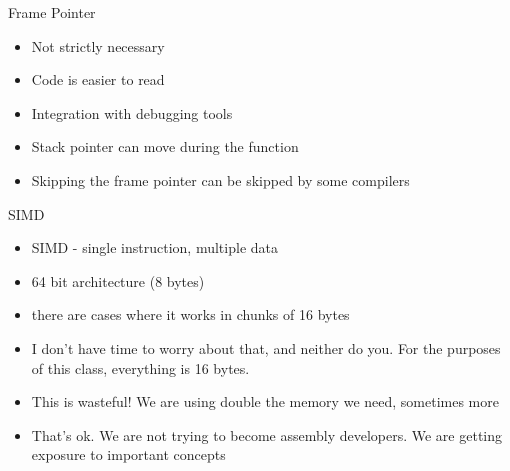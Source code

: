 

\begin{frame}{Frame Pointer}

	\begin{itemize}
		\item Not strictly necessary
		\item Code is easier to read
		\item Integration with debugging tools
		\item Stack pointer can move during the function
		\item Skipping the frame pointer can be skipped by some compilers
	\end{itemize}


\end{frame}


\begin{frame}{SIMD}

	\begin{itemize}
		\item SIMD - single instruction, multiple data
		\item 64 bit architecture (8 bytes)
		\item there are cases where it works in chunks of 16 bytes
		\item I don't have time to worry about that, and neither do you. For the purposes of this class, everything is 16 bytes.
		\item This is wasteful! We are using double the memory we need, sometimes more
		\item That's ok. We are not trying to become assembly developers. We are getting exposure to important concepts
	\end{itemize}

\end{frame}



